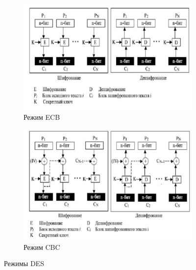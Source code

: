 \documentclass[a4paper, 14pt]{extarticle}
\begin{document}
\begin{figure}[h]
    \centering
    \begin{subfigure}[b]{0.43\textwidth}
        \includegraphics[width=\textwidth]{./img/S005.jpg}
        \caption{Режим ECB}%
        \label{img:1:5}
    \end{subfigure}%
    \hspace{2cm}
    \begin{subfigure}[b]{0.43\textwidth}
        \includegraphics[width=\textwidth]{./img/S006.jpg}
        \caption{Режим CBC}%
        \label{img:1:6}
    \end{subfigure}
    \caption{Режимы DES}
\end{figure}
\end{document}
